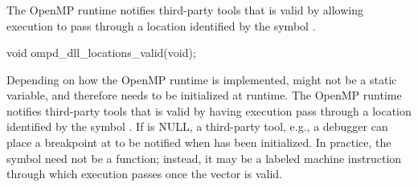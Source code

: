 \subsubsection{}
\label{ompd:ompd_dll_locations_valid}

\summary
The OpenMP runtime notifies third-party tools that 
is valid by allowing execution to pass through a location identified
by the symbol .


\cspecificstart
\begin{ompSyntax}
void ompd_dll_locations_valid(void);
\end{ompSyntax}
\cspecificend


\descr
Depending on how the OpenMP runtime is
implemented,  might not be a static
variable, and therefore needs to be initialized at runtime.  The
OpenMP runtime notifies third-party tools
that  is valid by having execution pass
through a location identified by the
symbol .
If  is NULL, a third-party tool, e.g., a
debugger can place a breakpoint at 
to be notified when  has been initialized.
In practice, the symbol  need not be
a function; instead, it may be a labeled machine instruction through
which execution passes once the vector is valid.

